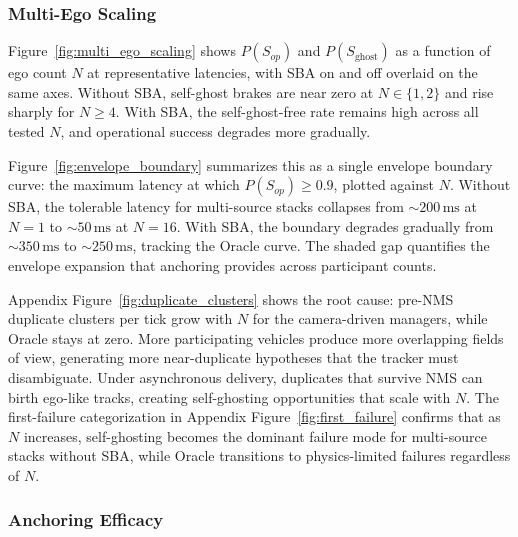 

\subsubsection{Multi-Ego Scaling}
\label{sec:eval:scaling_results}

Figure~\ref{fig:multi_ego_scaling} shows $P(S_{op})$ and $P(S_{\text{ghost}})$ as a function of ego count $N$ at representative latencies, with SBA on and off overlaid on the same axes. Without SBA, self-ghost brakes are near zero at $N \in \{1, 2\}$ and rise sharply for $N \geq 4$. With SBA, the self-ghost-free rate remains high across all tested $N$, and operational success degrades more gradually.



Figure~\ref{fig:envelope_boundary} summarizes this as a single envelope boundary curve: the maximum latency at which $P(S_{op}) \geq 0.9$, plotted against $N$. Without SBA, the tolerable latency for multi-source stacks collapses from ${\sim}200\,\mathrm{ms}$ at $N{=}1$ to ${\sim}50\,\mathrm{ms}$ at $N{=}16$. With SBA, the boundary degrades gradually from ${\sim}350\,\mathrm{ms}$ to ${\sim}250\,\mathrm{ms}$, tracking the Oracle curve. The shaded gap quantifies the envelope expansion that anchoring provides across participant counts.

Appendix Figure~\ref{fig:duplicate_clusters} shows the root cause: pre-NMS duplicate clusters per tick grow with $N$ for the camera-driven managers, while Oracle stays at zero. More participating vehicles produce more overlapping fields of view, generating more near-duplicate hypotheses that the tracker must disambiguate. Under asynchronous delivery, duplicates that survive NMS can birth ego-like tracks, creating self-ghosting opportunities that scale with $N$. The first-failure categorization in Appendix Figure~\ref{fig:first_failure} confirms that as $N$ increases, self-ghosting becomes the dominant failure mode for multi-source stacks without SBA, while Oracle transitions to physics-limited failures regardless of $N$.


\subsubsection{Anchoring Efficacy}
\label{sec:eval:anchoring}

